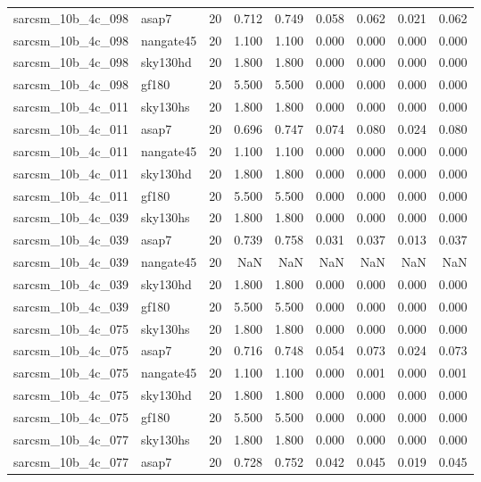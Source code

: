 \begin{tabular}{llrrrrrrr}
sarcsm\_10b\_4c\_098 & asap7 & 20 & 0.712 & 0.749 & 0.058 & 0.062 & 0.021 & 0.062 \\
sarcsm\_10b\_4c\_098 & nangate45 & 20 & 1.100 & 1.100 & 0.000 & 0.000 & 0.000 & 0.000 \\
sarcsm\_10b\_4c\_098 & sky130hd & 20 & 1.800 & 1.800 & 0.000 & 0.000 & 0.000 & 0.000 \\
sarcsm\_10b\_4c\_098 & gf180 & 20 & 5.500 & 5.500 & 0.000 & 0.000 & 0.000 & 0.000 \\
sarcsm\_10b\_4c\_011 & sky130hs & 20 & 1.800 & 1.800 & 0.000 & 0.000 & 0.000 & 0.000 \\
sarcsm\_10b\_4c\_011 & asap7 & 20 & 0.696 & 0.747 & 0.074 & 0.080 & 0.024 & 0.080 \\
sarcsm\_10b\_4c\_011 & nangate45 & 20 & 1.100 & 1.100 & 0.000 & 0.000 & 0.000 & 0.000 \\
sarcsm\_10b\_4c\_011 & sky130hd & 20 & 1.800 & 1.800 & 0.000 & 0.000 & 0.000 & 0.000 \\
sarcsm\_10b\_4c\_011 & gf180 & 20 & 5.500 & 5.500 & 0.000 & 0.000 & 0.000 & 0.000 \\
sarcsm\_10b\_4c\_039 & sky130hs & 20 & 1.800 & 1.800 & 0.000 & 0.000 & 0.000 & 0.000 \\
sarcsm\_10b\_4c\_039 & asap7 & 20 & 0.739 & 0.758 & 0.031 & 0.037 & 0.013 & 0.037 \\
sarcsm\_10b\_4c\_039 & nangate45 & 20 & NaN & NaN & NaN & NaN & NaN & NaN \\
sarcsm\_10b\_4c\_039 & sky130hd & 20 & 1.800 & 1.800 & 0.000 & 0.000 & 0.000 & 0.000 \\
sarcsm\_10b\_4c\_039 & gf180 & 20 & 5.500 & 5.500 & 0.000 & 0.000 & 0.000 & 0.000 \\
sarcsm\_10b\_4c\_075 & sky130hs & 20 & 1.800 & 1.800 & 0.000 & 0.000 & 0.000 & 0.000 \\
sarcsm\_10b\_4c\_075 & asap7 & 20 & 0.716 & 0.748 & 0.054 & 0.073 & 0.024 & 0.073 \\
sarcsm\_10b\_4c\_075 & nangate45 & 20 & 1.100 & 1.100 & 0.000 & 0.001 & 0.000 & 0.001 \\
sarcsm\_10b\_4c\_075 & sky130hd & 20 & 1.800 & 1.800 & 0.000 & 0.000 & 0.000 & 0.000 \\
sarcsm\_10b\_4c\_075 & gf180 & 20 & 5.500 & 5.500 & 0.000 & 0.000 & 0.000 & 0.000 \\
sarcsm\_10b\_4c\_077 & sky130hs & 20 & 1.800 & 1.800 & 0.000 & 0.000 & 0.000 & 0.000 \\
sarcsm\_10b\_4c\_077 & asap7 & 20 & 0.728 & 0.752 & 0.042 & 0.045 & 0.019 & 0.045 \\

\end{tabular}
